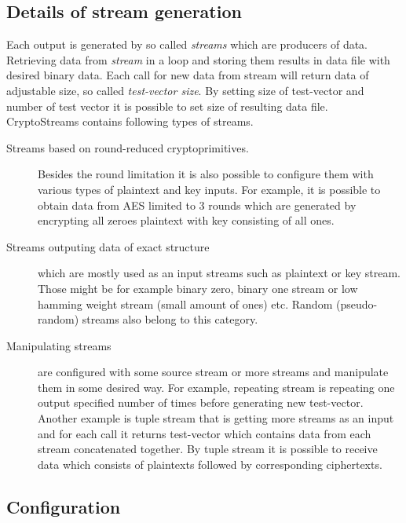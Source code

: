 \documentclass[
    digital,    %
    oneside,    %
    color,
    11pt,
    nocover,
    notable,
    nolof,
    nolot,
    final
]{fithesis3}
\begin{document}
\subsection{Details of stream generation}

Each output is generated by so called \textit{streams} which are producers of data. Retrieving data from \textit{stream} in a loop and storing them results in data file with desired binary data. Each call for new data from stream will return data of adjustable size, so called \textit{test-vector size}. By setting size of test-vector and number of test vector it is possible to set size of resulting data file. CryptoStreams contains following types of streams.

\begin{description}
	\item[Streams based on round-reduced cryptoprimitives.] Besides the round limitation it is also possible to configure them with various types of plaintext and key inputs. For example, it is possible to obtain data from AES limited to 3 rounds which are generated by encrypting all zeroes plaintext with key consisting of all ones. 
	\item[Streams outputing data of exact structure] which are mostly used as an input streams such as plaintext or key stream. Those might be for example binary zero, binary one stream or low hamming weight stream (small amount of ones) etc. Random (pseudo-random) streams also belong to this category.
	\item[Manipulating streams] are configured with some source stream or more streams and manipulate them in some desired way. For example, repeating stream is repeating one output specified number of times before generating new test-vector. Another example is tuple stream that is getting more streams as an input and for each call it returns test-vector which contains data from each stream concatenated together. By tuple stream it is possible to receive data which consists of plaintexts followed by corresponding ciphertexts. 
\end{description}


\subsection{Configuration}
\end{document}
